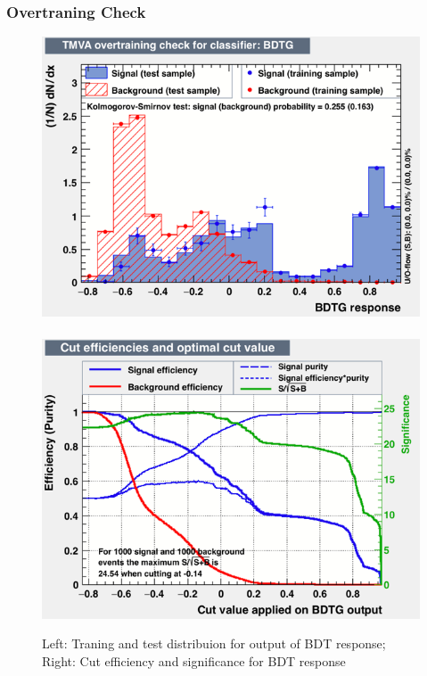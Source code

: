 \subsubsection{Overtraning Check}
\begin{figure}[h!]
	\includegraphics[scale=0.40]{Plots/BDT_Performance/Trial1/dataset/plots/overtrain_BDTG.png}%
	~
	\includegraphics[scale=0.40]{Plots/BDT_Performance/Trial1/dataset/plots/mvaeffs_BDTG.png}
	\caption{Left: Traning and test distribuion for output of BDT response; Right: Cut efficiency and significance for BDT response}
\end{figure}

